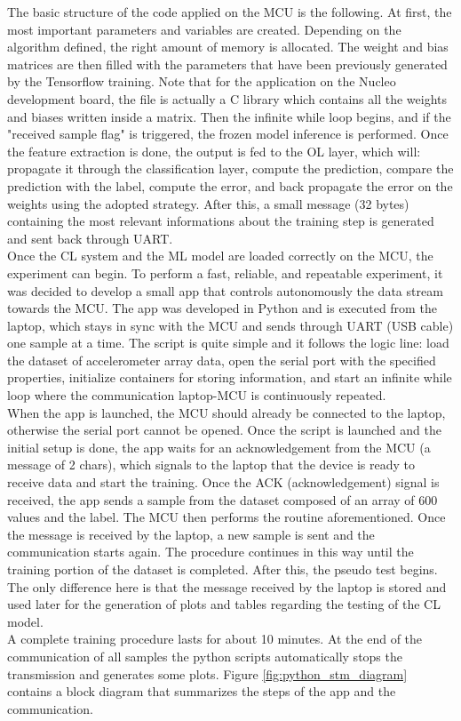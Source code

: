 \documentclass[12pt]{report}
\begin{document}
The basic structure of the code applied on the MCU is the following. At first, the most important parameters and variables are created. Depending on the algorithm defined, the right amount of memory is allocated. The weight and bias matrices are then filled with the parameters that have been previously generated by the Tensorflow training. Note that for the application on the Nucleo development board, the file is actually a C library which contains all the weights and biases written inside a matrix. Then the infinite while loop begins, and if the "received sample flag" is triggered, the frozen model inference is performed. Once the feature extraction is done, the output is fed to the OL layer, which will: propagate it through the classification layer, compute the prediction, compare the prediction with the label, compute the error, and back propagate the error on the weights using the adopted strategy. After this, a small message (32 bytes) containing the most relevant informations about the training step is generated and sent back through UART.\\
Once the CL system and the ML model are loaded correctly on the MCU, the experiment can begin. To perform a fast, reliable, and repeatable experiment, it was decided to develop a small app that controls autonomously the data stream towards the MCU. The app was developed in Python and is executed from the laptop, which stays in sync with the MCU and sends through UART (USB cable) one sample at a time. The script is quite simple and it follows the logic line: load the dataset of accelerometer array data, open the serial port with the specified properties, initialize containers for storing information, and start an infinite while loop where the communication laptop-MCU is continuously repeated. \\
When the app is launched, the MCU should already be connected to the laptop, otherwise the serial port cannot be opened. Once the script is launched and the initial setup is done, the app waits for an acknowledgement from the MCU (a message of 2 chars), which signals to the laptop that the device is ready to receive data and start the training. Once the ACK (acknowledgement) signal is received, the app sends a sample from the dataset composed of an array of 600 values and the label. The MCU then performs the routine aforementioned. Once the message is received by the laptop, a new sample is sent and the communication starts again. The procedure continues in this way until the training portion of the dataset is completed. After this, the pseudo test begins. The only difference here is that the message received by the laptop is stored and used later for the generation of plots and tables regarding the testing of the CL model.\\
A complete training procedure lasts for about 10 minutes. At the end of the communication of all samples the python scripts automatically stops the transmission and generates some plots. Figure \ref{fig:python_stm_diagram} contains a block diagram that summarizes the steps of the app and the communication.
\end{document}
